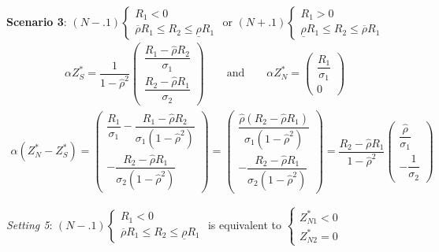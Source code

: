 \documentclass[10pt]{article}
\begin{document}
{\bf Scenario 3}: $ (N-.1) \left\{ \begin{matrix} R_1 < 0 \\ \overline{\rho} R_1 \leqslant R_2 \leqslant \underline{\rho} R_1 \end{matrix} \right. $ or $ (N+.1) \left\{ \begin{matrix} R_1 > 0 \\ \underline{\rho} R_1 \leqslant R_2 \leqslant \overline{\rho} R_1 \end{matrix} \right. $
\begin{eqnarray*}
\alpha Z_S^* = \dfrac1{1 - {\hat \rho}^2} \left( \begin{matrix} \dfrac{R_1 - {\hat \rho} R_2}{\sigma_1} \\ \dfrac{R_2 - {\hat \rho} R_1}{\sigma_2} \end{matrix} \right) \qquad \text{and} \qquad \alpha Z_N^* = \left( \begin{matrix} \dfrac{R_1}{\sigma_1} \\ 0 \end{matrix} \right)
\end{eqnarray*}
\begin{eqnarray*}
\alpha (Z_N^* - Z_S^*) = \left( \begin{matrix} \dfrac{R_1}{\sigma_1} - \dfrac{R_1 - {\hat \rho} R_2}{\sigma_1 (1 - {\hat \rho}^2)} \\ - \dfrac{R_2 - {\hat \rho} R_1}{\sigma_2 (1 - {\hat \rho}^2)} \end{matrix} \right) = \left( \begin{matrix} \dfrac{{\hat \rho} (R_2 - {\hat \rho} R_1)}{\sigma_1 (1 - {\hat \rho}^2)} \\ - \dfrac{R_2 - {\hat \rho} R_1}{\sigma_2 (1 - {\hat \rho}^2)} \end{matrix} \right) = \dfrac{R_2 - {\hat \rho} R_1}{1 - {\hat \rho}^2} \left( \begin{matrix} \dfrac{{\hat \rho}}{\sigma_1} \\ - \dfrac{1}{\sigma_2} \end{matrix} \right)
\end{eqnarray*}

{\it Setting 5}: $ (N-.1) \left\{ \begin{matrix} R_1 < 0 \\ \overline{\rho} R_1 \leqslant R_2 \leqslant \underline{\rho} R_1 \end{matrix} \right. $ is equivalent to $ \left\{ \begin{matrix} Z_{N 1}^* < 0 \\ Z_{N 2}^* = 0 \end{matrix} \right. $
\end{document}
